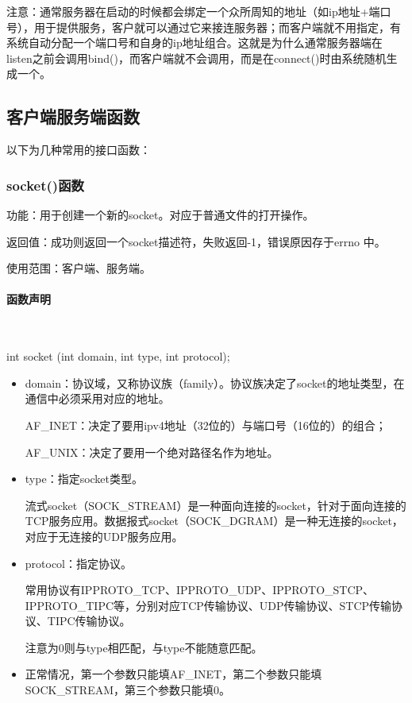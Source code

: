 \documentclass[UTF8]{article}%
\begin{document}
注意：通常服务器在启动的时候都会绑定一个众所周知的地址（如ip地址+端口号），用于提供服务，客户就可以通过它来接连服务器；而客户端就不用指定，有系统自动分配一个端口号和自身的ip地址组合。这就是为什么通常服务器端在listen之前会调用bind()，而客户端就不会调用，而是在connect()时由系统随机生成一个。

\subsection{客户端服务端函数}

以下为几种常用的接口函数：

\subsubsection{socket()函数}

功能：用于创建一个新的socket。对应于普通文件的打开操作。

返回值：成功则返回一个socket描述符，失败返回-1，错误原因存于errno 中。

使用范围：客户端、服务端。

\paragraph{函数声明}~{}

int socket (int domain, int type, int protocol);

\begin{itemize}
    \item domain：协议域，又称协议族（family）。协议族决定了socket的地址类型，在通信中必须采用对应的地址。
    
        AF\_INET：决定了要用ipv4地址（32位的）与端口号（16位的）的组合；

        AF\_UNIX：决定了要用一个绝对路径名作为地址。

    \item type：指定socket类型。
    
        流式socket（SOCK\_STREAM）是一种面向连接的socket，针对于面向连接的TCP服务应用。数据报式socket（SOCK\_DGRAM）是一种无连接的socket，对应于无连接的UDP服务应用。

    \item protocol：指定协议。
    
        常用协议有IPPROTO\_TCP、IPPROTO\_UDP、IPPROTO\_STCP、IPPROTO\_TIPC等，分别对应TCP传输协议、UDP传输协议、STCP传输协议、TIPC传输协议。

        注意为0则与type相匹配，与type不能随意匹配。

    \item 正常情况，第一个参数只能填AF\_INET，第二个参数只能填SOCK\_STREAM，第三个参数只能填0。
\end{itemize}
\end{document}
